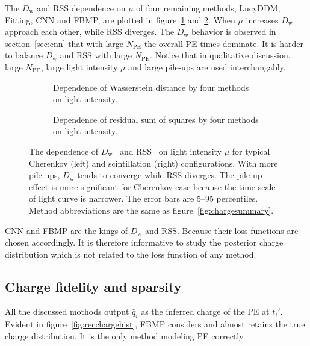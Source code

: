 The $D_\mathrm{w}$ and RSS dependence on $\mu$ of four remaining methods, LucyDDM, Fitting, CNN and FBMP, are plotted in figure~\ref{fig:wdistsummary} and \ref{fig:rsssummary}.  When $\mu$ increases $D_\mathrm{w}$ approach each other, while RSS diverges.  The $D_\mathrm{w}$ behavior is observed in section~\ref{sec:cnn} that with large $N_\mathrm{PE}$ the overall PE times dominate.  It is harder to balance $D_\mathrm{w}$ and RSS with large $N_\mathrm{PE}$.  Notice that in qualitative discussion, large $N_\mathrm{PE}$, large light intensity $\mu$ and large pile-ups are used interchangably.
\begin{figure}[H]
  \begin{subfigure}[b]{\textwidth}
    \resizebox{\textwidth}{!}{}
    \caption{\label{fig:wdistsummary}Dependence of Wasserstein distance by four methods on light intensity.}
  \end{subfigure}

  \vspace{0.5em}
  \begin{subfigure}[b]{\textwidth}
    \resizebox{\textwidth}{!}{}
    \caption{\label{fig:rsssummary}Dependence of residual sum of squares by four methods on light intensity.}
  \end{subfigure}
  \caption{\label{fig:summary}The dependence of $D_\mathrm{w}$~ and RSS~ on light intensity $\mu$ for typical Cherenkov (left) and scintillation (right) configurations.  With more pile-ups, $D_\mathrm{w}$ tends to converge while RSS diverges.  The pile-up effect is more significant for Cherenkov case because the time scale of light curve is narrower.  The error bars are 5--95 percentiles.  Method abbreviations are the same as figure~\ref{fig:chargesummary}. }
\end{figure}

CNN and FBMP are the kings of $D_\mathrm{w}$ and RSS.  Because their loss functions are chosen accordingly.  It is therefore informative to study the posterior charge distribution which is not related to the loss function of any method.

\subsection{Charge fidelity and sparsity}

All the discussed mothods output $\hat{q}_i$ as the inferred charge of the PE at $t_i'$.  Evident in figure~\ref{fig:recchargehist}, FBMP considers and almost retains the true charge distribution.  It is the only method modeling PE correctly.

